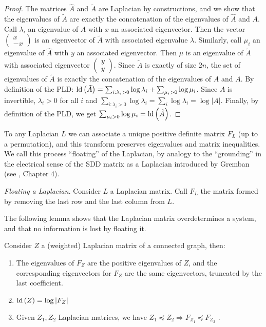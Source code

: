 \begin{proof}
The matrices $\hat{A}$ and $\tilde{A}$ are Laplacian by constructions,
and we show that the eigenvalues of $\tilde{A}$ are exactly the concatenation
of the eigenvalues of $\hat{A}$ and $A$. Call $\lambda_{i}$ an
eigenvalue of $A$ with $x$ an associated eigenvector. Then the vector
$\left(\begin{array}{c}
x\\
-x
\end{array}\right)$ is an eigenvector of $\tilde{A}$ with associated eigenvalue $\lambda$.
Similarly, call $\mu_{i}$ an eigenvalue of $\hat{A}$ with $y$ an
associated eigenvector. Then $\mu$ is an eigenvalue of $\tilde{A}$
with associated eigenvector $\left(\begin{array}{c}
y\\
y
\end{array}\right)$. Since $\tilde{A}$ is exactly of size $2n$, the set of eigenvalues
of $\tilde{A}$ is exactly the concatenation of the eigenvalues of
$\hat{A}$ and $A$. By definition of the PLD: $\text{\textnormal{ld}}\left(\tilde{A}\right)=\sum_{i:\lambda_{i}>0}\log\lambda_{i}+\sum_{\mu_{i}>0}\log\mu_{i}$.
Since $A$ is invertible, $\lambda_{i}>0$ for all $i$ and $\sum_{i:\lambda_{i}>0}\log\lambda_{i}=\sum_{i}\log\lambda_{i}=\log\left|A\right|$.
Finally, by definition of the PLD, we get $\sum_{\mu_{i}>0}\log\mu_{i}=\text{\textnormal{ld}}\left(\hat{A}\right)$. 
\end{proof}

To any Laplacian $L$ we can associate a unique positive definite
matrix $F_{L}$ (up to a permutation), and this transform preserves
eigenvalues and matrix inequalities. We call this process ``floating''
of the Laplacian, by analogy to the ``grounding'' in the electrical
sense of the SDD matrix as a Laplacian introduced by Gremban (see
\cite{Gremban1996}, Chapter 4). 
\begin{definition}
\emph{Floating a Laplacian}. Consider $L$ a Laplacian matrix. Call
$F_{L}$ the matrix formed by removing the last row and the last column
from $L$. 
\end{definition}

The following lemma shows that the Laplacian matrix overdetermines
a system, and that no information is lost by floating it. 
\begin{lemma}
\label{lem:floating-properties}Consider $Z$ a (weighted) Laplacian
matrix of a connected graph, then: 
\begin{enumerate}
\item The eigenvalues of $F_{Z}$ are the positive eigenvalues of $Z$,
and the corresponding eigenvectors for $F_{Z}$ are the same eigenvectors,
truncated by the last coefficient. 
\item $\text{\textnormal{ld}}\left(Z\right)=\log\left|F_{Z}\right|$ 
\item Given $Z_{1},Z_{2}$ Laplacian matrices, we have $Z_{1}\preceq Z_{2}\Rightarrow F_{Z_{1}}\preceq F_{Z_{2}}$
. 
\end{enumerate}
\end{lemma}

